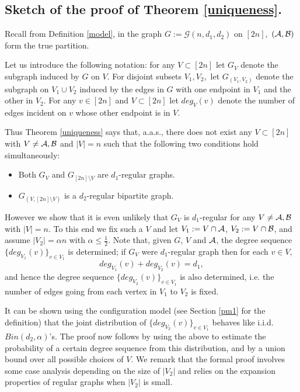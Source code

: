 \documentclass[11pt,reqno]{amsart}
\begin{document}
\subsection{Sketch of the proof of Theorem \ref{uniqueness}.} \label{uni}
Recall from Definition \ref{model}, in the graph $G:=\mathcal{G}(n,d_1,d_2)$ on $[2n],$ $(\mathcal{A},\mathcal{B})$ form the true partition.

Let us introduce the following notation: for any $V\subset [2n]$ let $G_V$ denote the subgraph induced by $G$ on $V$. For disjoint subsets $V_1,V_2,$ let $G_{(V_1,V_2)}$ denote the subgraph on $V_1 \cup V_2$ induced by the edges in $G$ with one endpoint in $V_1$ and the other in $V_2.$
For any $v\in [2n]$ and $V \subset [2n]$ let $deg_V(v)$ denote the number of edges incident on $v$ whose other endpoint is in $V$.


Thus Theorem \ref{uniqueness} says that, a.a.s., there does not exist any $V\subset [2n]$ with $V\neq \mathcal{A},\mathcal{B}$  and $|V|=n$ such that the following two conditions hold simultaneously:

\begin{itemize}
\item Both $G_{V}$ and $G_{[2n]\setminus V}$ are $d_1$-regular graphs.
\item $G_{(V,[2n]\setminus V)}$ is a $d_2$-regular bipartite graph.
\end{itemize}
 
However we show that it is even unlikely that  $G_{V}$ is
$d_1$-regular for any $V \neq \mathcal{A},\mathcal{B}$ with $|V|=n$. 
To this end we fix such a $V$ and  let $V_1:=V\cap \mathcal{A}$, $V_2:=V \cap \mathcal{B}$, and assume $|V_2|=\alpha n$ with $\alpha \le \frac{1}{2}.$
Note that, given $G$, $V$ and $\mathcal{A}$, the degree sequence
$\{deg_{V_1}(v)\}_{v \in V_1}$ is determined; if $G_V$ were
$d_1$-regular graph then for each $v \in V$, $$deg_{V_1}(v)+deg_{V_2}(v)=d_1,$$ 
and hence the degree sequence $\{deg_{V_2}(v)\}_{v \in V_1}$ is also determined, i.e. the number of edges going from each vertex in $V_1$ to $V_2$ is fixed. 

It can be shown using the configuration model (see Section \ref{pm1}
for the definition) that the joint distribution of 
 $\{deg_{V_2}(v)\}_{v \in V_1}$ behaves like i.i.d.\
 $Bin(d_2,\alpha)$'s. The proof now follows by using the above to
 estimate the probability of a certain degree sequence from this
 distribution, and by a union bound over all possible choices of $V.$
We remark that the formal proof involves some case analysis depending on the size of $|V_2|$ and relies on the expansion properties of regular graphs when $|V_2|$ is small.  
\end{document}
